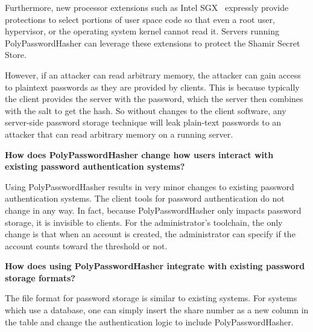 Furthermore, new processor extensions such as Intel 
SGX~\cite{mckeen2013innovative} expressly provide protections to select 
portions of user space code so that even a root user, hypervisor, or the 
operating system kernel cannot read it.   Servers running PolyPasswordHasher can 
leverage these extensions to protect the Shamir Secret Store.

However, if an attacker can read
arbitrary memory, the attacker can gain access to plaintext passwords
as they are provided by clients.    This is because typically the client
provides the server with the password, which the
server then combines with the salt to get the hash.  
So without changes to the client software, any server-side
password storage technique will leak plain-text passwords to an attacker
that can read arbitrary memory on a running server.



{\bf How does PolyPasswordHasher change how users interact with existing password authentication systems?}

Using PolyPasswordHasher results in very minor changes to existing password
authentication systems.   
%
The client tools for password authentication do not change in any way.   In 
fact, because PolyPasswordHasher only impacts password storage, it is invisible to 
clients.   %
For the administrator's toolchain, the only change is that 
when an account is created, the administrator can specify if the account counts
toward the threshold or not.

{\bf How does using PolyPasswordHasher integrate with existing password storage 
formats?}

The file format for password storage is similar to existing systems.
For systems which use a database, one can simply insert the share number
as a new column in the table and change the authentication logic to include
PolyPasswordHasher.   


